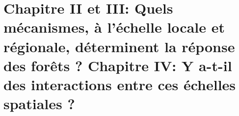 \documentclass[11pt, compress, aspectratio=1610]{beamer}
\begin{document}
\section{\texorpdfstring{Chapitre II et III: \newline Quels mécanismes,
à l'échelle locale et régionale, déterminent la réponse des forêts ?
\newline Chapitre IV: \newline Y a-t-il des interactions entre ces
échelles spatiales
?}{Chapitre II et III: Quels mécanismes, à l'échelle locale et régionale, déterminent la réponse des forêts ? Chapitre IV: Y a-t-il des interactions entre ces échelles spatiales ?}}\label{chapitre-ii-et-iii-quels-muxe9canismes-uxe0-luxe9chelle-locale-et-ruxe9gionale-duxe9terminent-la-ruxe9ponse-des-foruxeats-chapitre-iv-y-a-t-il-des-interactions-entre-ces-uxe9chelles-spatiales}
\end{document}
